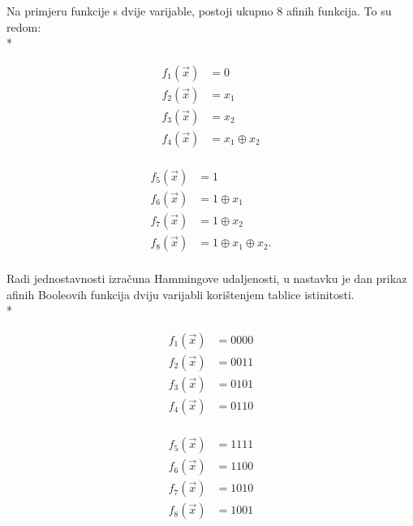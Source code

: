 Na primjeru funkcije s dvije varijable, postoji ukupno $8$ afinih funkcija.
To su redom: \\*
\begin{minipage}[t]{.5\textwidth}
    \begin{equation*}
        \begin{aligned}
            f_1(\vec{x}) &= 0\\
            f_2(\vec{x}) &= x_1\\
            f_3(\vec{x}) &= x_2\\
            f_4(\vec{x}) &= x_1 \oplus x_2\\
        \end{aligned}
    \end{equation*}
\end{minipage}%
\begin{minipage}[t]{.5\textwidth}
    \begin{equation*}
        \begin{aligned}
            f_5(\vec{x}) &= 1\\
            f_6(\vec{x}) &= 1 \oplus x_1\\
            f_7(\vec{x}) &= 1 \oplus x_2\\
            f_8(\vec{x}) &= 1 \oplus x_1 \oplus x_2.\\
        \end{aligned}
    \end{equation*}
\end{minipage}
Radi jednostavnosti izračuna Hammingove udaljenosti, u nastavku je dan prikaz afinih Booleovih funkcija dviju varijabli korištenjem tablice istinitosti.\\*
\begin{minipage}[t]{.5\textwidth}
    \begin{equation*}
        \begin{aligned}
            f_1(\vec{x}) &= 0000\\
            f_2(\vec{x}) &= 0011\\
            f_3(\vec{x}) &= 0101\\
            f_4(\vec{x}) &= 0110\\
        \end{aligned}
    \end{equation*}
\end{minipage}%
\begin{minipage}[t]{.5\textwidth}
    \begin{equation*}
        \begin{aligned}
            f_5(\vec{x}) &= 1111\\
            f_6(\vec{x}) &= 1100\\
            f_7(\vec{x}) &= 1010\\
            f_8(\vec{x}) &= 1001\\
        \end{aligned}
    \end{equation*}
\end{minipage}
